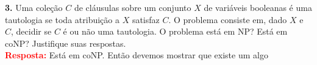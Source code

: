 
\noindent\textbf{3.} Uma coleção $C$ de cláusulas sobre um conjunto $X$ de variáveis booleanas é uma tautologia se toda atribuição a $X$ satisfaz $C$. O problema  consiste em, dado $X$ e $C$, decidir se $C$ é ou não uma tautologia. O problema  está em NP? Está em coNP? Justifique suas respostas.\\[6pt]
\textcolor{red}{\textbf{Resposta:}} Está em coNP. Então devemos mostrar que existe um algo 